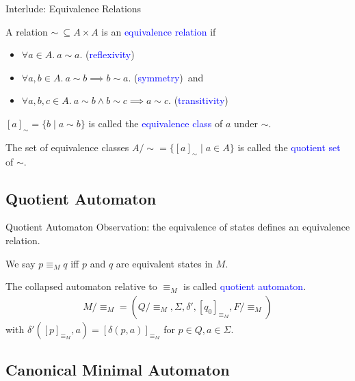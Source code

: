 \documentclass{beamer}
\def\padding{\vspace{0.5cm}}
\def\spadding{\vspace{0.25cm}}
\def\b{\textcolor{blue}}
\begin{document}
\begin{frame}{Interlude: Equivalence Relations}
    \begin{definition}
        A relation $\sim\ \subseteq A \times A$ is an \b{equivalence relation} if\pause
        \begin{itemize}
            \item $\forall a \in A.\ a \sim a.$ (\b{reflexivity})\pause
            \item $\forall a, b \in A.\ a \sim b \implies b \sim a.$ (\b{symmetry})\pause\ and
            \item $\forall a, b, c \in A.\ a \sim b \land b \sim c \implies a \sim c.$ (\b{transitivity})
        \end{itemize}\pause\par\padding
        $[a]_\sim = \{b \mid a \sim b\}$ is called the \b{equivalence class} of $a$ under $\sim$.\pause\par\padding
        The set of equivalence classes $A/{\sim} = \{[a]_\sim \mid a \in A\}$ is called the \b{quotient set} of $\sim$.
    \end{definition}
\end{frame}

\subsection{Quotient Automaton}

\begin{frame}{Quotient Automaton}
    Observation: the equivalence of states defines an equivalence relation.\pause\par\spadding
    We say $p \equiv_M q$ iff $p$ and $q$ are equivalent states in $M$.\pause\padding
    \begin{definition}
        The collapsed automaton relative to $\equiv_M$ is called \b{quotient automaton}.\pause
        \begin{align*}
            M/{\equiv_M} = (Q/{\equiv_M}, \Sigma, \delta', [q_0]_{\equiv_M}, F/{\equiv_M})
        \end{align*}\pause
        with $\delta'([p]_{\equiv_M}, a) = [\delta(p, a)]_{\equiv_M}$ for $p \in Q, a \in \Sigma$.
    \end{definition}
\end{frame}

\subsection{Canonical Minimal Automaton}
\end{document}
